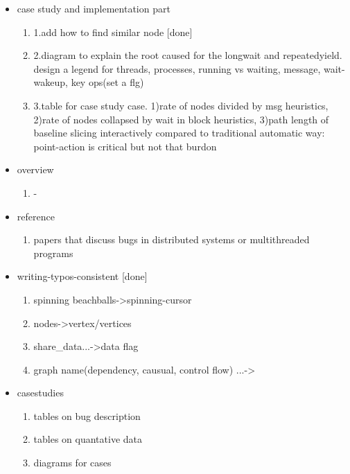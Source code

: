 \begin{itemize}

\item case study and implementation part
	\begin{enumerate}
 	\item 1.add how to find similar node [done]
 	\item 2.diagram to explain the root caused for the longwait and repeatedyield. design a legend for threads, processes, running vs waiting, message, wait-wakeup, key ops(set a flg)
	\item 3.table for case study case. 
		1)rate of nodes divided by msg heuristics,
		2)rate of nodes collapsed by wait in block heuristics,
		3)path length of baseline slicing interactively compared to traditional automatic way: point-action is critical but not that burdon

	\end{enumerate}
\item overview
	\begin{enumerate}
	\item -
	\end{enumerate}

\item reference
	\begin{enumerate}
	\item papers that discuss bugs in distributed systems or multithreaded programs
	\end{enumerate}

\item writing-typos-consistent [done]
	\begin{enumerate}
	\item spinning beachballs->spinning-cursor
	\item nodes->vertex/vertices
	\item share\_data...->data flag
	\item graph name(dependency, causual, control flow) ...->
	\end{enumerate}

\item casestudies
	\begin{enumerate}
	\item tables on bug description
	\item tables on quantative data
	\item diagrams for cases
	\end{enumerate}

\end{itemize}
